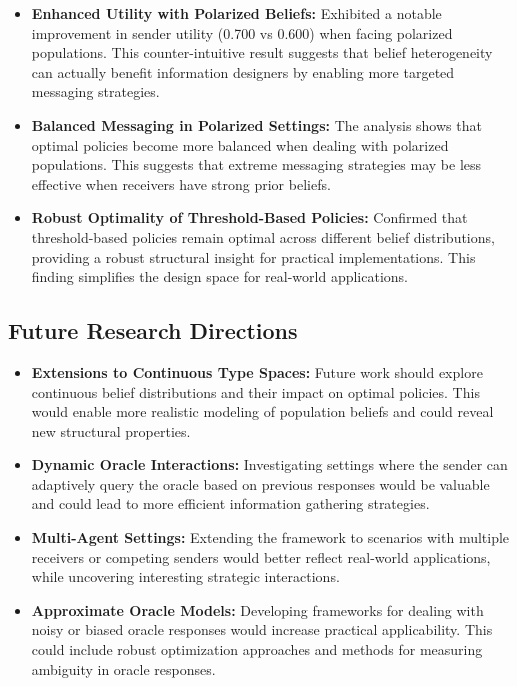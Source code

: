 \documentclass[12pt]{article}
\theoremstyle{plain}
\theoremstyle{definition}
\theoremstyle{remark}
\begin{document}
\begin{itemize}
    \item \textbf{Enhanced Utility with Polarized Beliefs:} Exhibited a notable improvement in sender utility (0.700 vs 0.600) when facing polarized populations. This counter-intuitive result suggests that belief heterogeneity can actually benefit information designers by enabling more targeted messaging strategies.
    
    \item \textbf{Balanced Messaging in Polarized Settings:} The analysis shows that optimal policies become more balanced when dealing with polarized populations. This suggests that extreme messaging strategies may be less effective when receivers have strong prior beliefs.
    
    \item \textbf{Robust Optimality of Threshold-Based Policies:} Confirmed that threshold-based policies remain optimal across different belief distributions, providing a robust structural insight for practical implementations. This finding simplifies the design space for real-world applications.
\end{itemize}

\subsection{Future Research Directions}
\begin{itemize}
    \item \textbf{Extensions to Continuous Type Spaces:} Future work should explore continuous belief distributions and their impact on optimal policies. This would enable more realistic modeling of population beliefs and could reveal new structural properties.
    
    \item \textbf{Dynamic Oracle Interactions:} Investigating settings where the sender can adaptively query the oracle based on previous responses would be valuable and could lead to more efficient information gathering strategies.
    
    \item \textbf{Multi-Agent Settings:} Extending the framework to scenarios with multiple receivers or competing senders would better reflect real-world applications, while uncovering interesting strategic interactions.
    
    \item \textbf{Approximate Oracle Models:} Developing frameworks for dealing with noisy or biased oracle responses would increase practical applicability. This could include robust optimization approaches and methods for measuring ambiguity in oracle responses.
\end{itemize}
\end{document}
